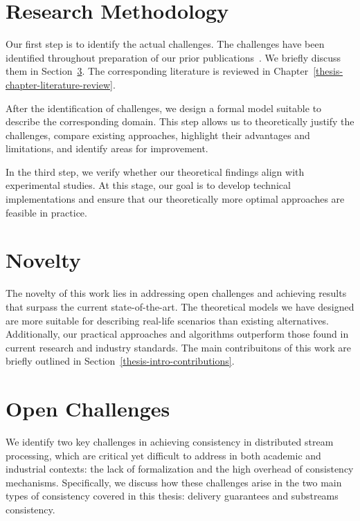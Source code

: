 \section{Research Methodology}

Our first step is to identify the actual challenges. The challenges have been identified throughout preparation of our prior publications~\cite{we2018adbis, trofimov2018consistency, we2018seim, we2018beyondmr, we2019debs, webirte, thepaper, 10.1145/3524860.3539809, trofimov2023bounding}. We briefly discuss them in Section~\ref{thesis-intro-challenges}. The corresponding literature is reviewed in Chapter~\ref{thesis-chapter-literature-review}.

After the identification of challenges, we design a formal model suitable to describe the corresponding domain. This step allows us to theoretically justify the challenges, compare existing approaches, highlight their advantages and limitations, and identify areas for improvement.

In the third step, we verify whether our theoretical findings align with experimental studies. At this stage, our goal is to develop technical implementations and ensure that our theoretically more optimal approaches are feasible in practice.

\section{Novelty}

The novelty of this work lies in addressing open challenges and achieving results that surpass the current state-of-the-art. The theoretical models we have designed are more suitable for describing real-life scenarios than existing alternatives. Additionally, our practical approaches and algorithms outperform those found in current research and industry standards. The main contribuitons of this work are briefly outlined in Section~\ref{thesis-intro-contributions}.

\section{Open Challenges}
\label{thesis-intro-challenges}

We identify two key challenges in achieving consistency in distributed stream processing, which are critical yet difficult to address in both academic and industrial contexts: the lack of formalization and the high overhead of consistency mechanisms. Specifically, we discuss how these challenges arise in the two main types of consistency covered in this thesis: delivery guarantees and substreams consistency.

